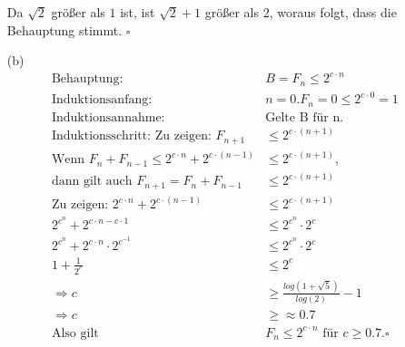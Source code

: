 \documentclass{article}
\begin{document}
\begin{enumerate}
Da $\sqrt{2}$ größer als $1$ ist, ist $\sqrt{2}+1$ größer als $2$, woraus folgt,
dass die Behauptung stimmt. \quad $\square$

\item[(b)]
\begin{align*}
\text{Behauptung: } &B = F_n \le 2^{c \cdot n} \\
\text{Induktionsanfang: } & n = 0. F_n = 0 \le 2^{c \cdot 0} = 1 \\
\text{Induktionsannahme: } &\text{Gelte B für n. } \\
\text{Induktionsschritt: Zu zeigen: } F_{n+1} &\le 2^{c \cdot (n+1)} \\
\text{Wenn } F_n + F_{n-1} \le 2^{c \cdot n} + 2^{c \cdot (n-1)} &\le 2^{c \cdot (n+1)}, \\
\text{dann gilt auch } F_{n+1} = F_n + F_{n-1} &\le 2^{c \cdot (n+1)} \\
\text{Zu zeigen: }  2^{c \cdot n} + 2^{c \cdot (n-1)} &\le 2^{c \cdot (n+1)} \\
2^{c^n} + 2^{c \cdot n - c \cdot 1} &\le 2^{c^n} \cdot 2^c \\
2^{c^n} + 2^{c \cdot n} \cdot 2^{c^{-1}} &\le 2^{c^n} \cdot 2^c \\
1 + \frac{1}{2^c} &\le 2^c \\
\Rightarrow c &\ge \frac{log(1+\sqrt5)}{log(2)} -1 \\
\Rightarrow c &\ge \approx 0.7 \\
\text{Also gilt } &F_n \le 2^{c \cdot n} \text{ für } c \ge 0.7. \square
\end{align*}
\end{enumerate}
\end{document}
